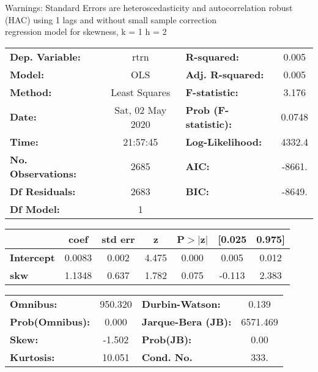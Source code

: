 Warnings: \newline
 [1] Standard Errors are heteroscedasticity and autocorrelation robust (HAC) using 1 lags and without small sample correction\\ 

regression model for skewness, k = 1 h = 2\begin{center}
\begin{tabular}{lclc}
\toprule
\textbf{Dep. Variable:}    &       rtrn       & \textbf{  R-squared:         } &     0.005   \\
\textbf{Model:}            &       OLS        & \textbf{  Adj. R-squared:    } &     0.005   \\
\textbf{Method:}           &  Least Squares   & \textbf{  F-statistic:       } &     3.176   \\
\textbf{Date:}             & Sat, 02 May 2020 & \textbf{  Prob (F-statistic):} &   0.0748    \\
\textbf{Time:}             &     21:57:45     & \textbf{  Log-Likelihood:    } &    4332.4   \\
\textbf{No. Observations:} &        2685      & \textbf{  AIC:               } &    -8661.   \\
\textbf{Df Residuals:}     &        2683      & \textbf{  BIC:               } &    -8649.   \\
\textbf{Df Model:}         &           1      & \textbf{                     } &             \\
\bottomrule
\end{tabular}
\begin{tabular}{lcccccc}
                   & \textbf{coef} & \textbf{std err} & \textbf{z} & \textbf{P$> |$z$|$} & \textbf{[0.025} & \textbf{0.975]}  \\
\midrule
\textbf{Intercept} &       0.0083  &        0.002     &     4.475  &         0.000        &        0.005    &        0.012     \\
\textbf{skw}       &       1.1348  &        0.637     &     1.782  &         0.075        &       -0.113    &        2.383     \\
\bottomrule
\end{tabular}
\begin{tabular}{lclc}
\textbf{Omnibus:}       & 950.320 & \textbf{  Durbin-Watson:     } &    0.139  \\
\textbf{Prob(Omnibus):} &   0.000 & \textbf{  Jarque-Bera (JB):  } & 6571.469  \\
\textbf{Skew:}          &  -1.502 & \textbf{  Prob(JB):          } &     0.00  \\
\textbf{Kurtosis:}      &  10.051 & \textbf{  Cond. No.          } &     333.  \\
\bottomrule
\end{tabular}
\end{center}

